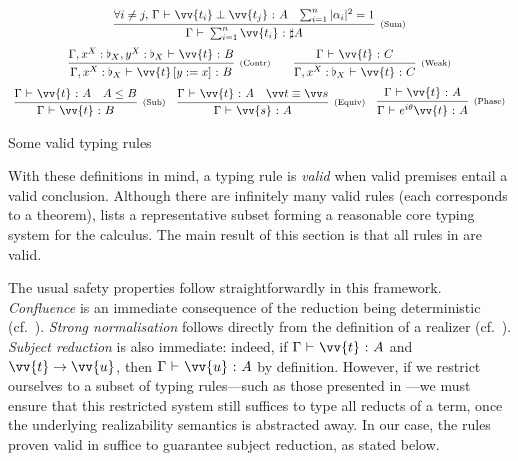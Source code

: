 \documentclass[runningheads,orivec,envcountsame,envcountsect]{llncs}
\providecommand{\qed}{\hbox{\rule{1ex}{1ex}}}%
\def\SUB#1#2{#1\le#2}
\def\TYP#1#2#3{#1~{\vdash}~#2~{:}~#3}
\def\SORTH#1#2#3#4{#1~{\vdash}~#2\perp#3~{:}~#4}
\def\snam#1{\textsc{\scriptsize\upshape(#1)}}
\newcommand\basis[1]{\ensuremath{\flat_{#1}}}
\begin{document}
\begin{table}[t]
\[\begin{array}{c}
{      }\\
      \noalign{\medskip}
      \infer[\snam{Sum}]
      {\TYP{\Gamma}{\sum_{i=1}^{n} \vv{t_i}}{\sharp A}}
      {\forall i\neq j,\, \SORTH{\Gamma}{\vv{t_i}}{\vv{t_j}}{A} &
      \sum_{i=1}^{n}|\alpha_i|^2 = 1}
      \\
      \noalign{\medskip}
      \infer[\snam{Contr}]{\TYP{\Gamma,x^{X}:{\basis{X}}}{\vv{t}\,[y:=x]}{B}}{
	\TYP{\Gamma,x^{X}:{\basis{X}},y^{X}:{\basis{X}}}{\vv{t}}{B}
      } 
      \qquad
	\infer[\snam{Weak}]{\TYP{\Gamma,x^{X}:\basis{X}}{\vv{t}}{C}}{
	  \TYP{\Gamma}{\vv{t}}{C}
	}
      \\
      \noalign{\medskip}
      \infer[\snam{Sub}]{\TYP{\Gamma}{\vv{t}}{B}}{\TYP{\Gamma}{\vv{t}}{A} & \SUB{A}{B}}
      \quad
      \infer[\snam{Equiv}]{\TYP{\Gamma}{\vv{s}}{A}}{
	\TYP{\Gamma}{\vv{t}}{A}& \vv t\equiv \vv s
      }
      \quad 
      \infer[\snam{Phase}]{\TYP{\Gamma}{e^{i\theta}\vv{t}}{A}}
      {\TYP{\Gamma}{\vv{t}}{A}}
    \end{array}
  \]
  \caption{Some valid typing rules}
  \label{tab:TypingRules}
\end{table}

With these definitions in mind, a typing rule is \emph{valid} when valid
premises entail a valid conclusion.  
Although there are infinitely many valid rules (each corresponds to a theorem),
 lists a representative subset forming a reasonable core
typing system for the calculus.  
The main result of this section is that all rules in  are
valid.



The usual safety properties follow straightforwardly in this framework.
\emph{Confluence} is an immediate consequence of the reduction being
deterministic (cf.~).  
\emph{Strong normalisation} follows directly from the definition of a
realizer (cf.~).  
\emph{Subject reduction} is also immediate: indeed, if
$\TYP{\Gamma}{\vv{t}}{A}$ and $\vv{t}\to\vv{u}$, then
$\TYP{\Gamma}{\vv{u}}{A}$ by definition.
However, if we restrict ourselves to a subset of typing rules—such as those
presented in —we must
ensure that this restricted system still suffices to type all reducts of a
term, once the underlying realizability semantics is abstracted away.  In our
case, the rules proven valid in 
suffice to guarantee subject reduction, as
stated below.
\end{document}
